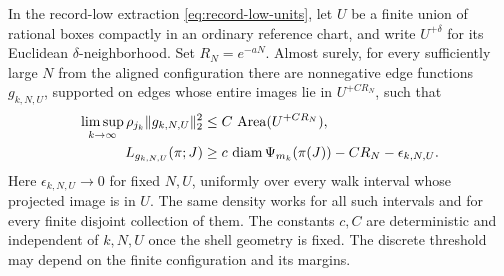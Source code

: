 \begin{lemma}\label{lem:edge-density-budget}
In the record-low extraction \eqref{eq:record-low-units}, let \(U\) be a
finite union of rational boxes compactly in an ordinary reference chart,
and write \(U^{+\delta}\) for its Euclidean \(\delta\)-neighborhood.
Set \(R_N=e^{-aN}\).  Almost surely, for every sufficiently large \(N\)
from the aligned configuration there are nonnegative edge functions
\(g_{k,N,U}\), supported on edges whose entire images lie in
\(U^{+CR_N}\), such that
\begin{align}
 \limsup_{k\to\infty}\rho_{j_k}\lVert g_{k,N,U}\rVert_2^2
     &\le C\,\operatorname{Area}(U^{+CR_N}),\label{eq:edge-budget-energy}\\
 L_{g_{k,N,U}}(\pi;J)
     &\ge c\,\operatorname{diam} \Psi_{m_k}(\pi(J))-CR_N-\epsilon_{k,N,U}.
       \label{eq:edge-budget-charge}
\end{align}
Here \(\epsilon_{k,N,U}\to0\) for fixed \(N,U\), uniformly over every
walk interval whose projected image is in \(U\).  The same density works
for all such intervals and for every finite disjoint collection of them.
The constants \(c,C\) are deterministic and independent of \(k,N,U\)
once the shell geometry is fixed.  The discrete threshold may depend on
the finite configuration and its margins.
\end{lemma}

